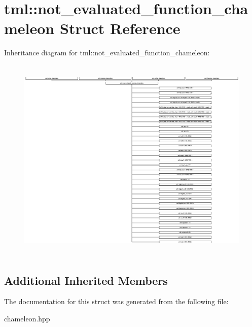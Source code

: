 \hypertarget{structtml_1_1not__evaluated__function__chameleon}{\section{tml\+:\+:not\+\_\+evaluated\+\_\+function\+\_\+chameleon Struct Reference}
\label{structtml_1_1not__evaluated__function__chameleon}
}
Inheritance diagram for tml\+:\+:not\+\_\+evaluated\+\_\+function\+\_\+chameleon\+:\begin{figure}[H]
\begin{center}
\leavevmode
\includegraphics[height=9.939148cm]{structtml_1_1not__evaluated__function__chameleon}
\end{center}
\end{figure}
\subsection*{Additional Inherited Members}


The documentation for this struct was generated from the following file\+:\begin{DoxyCompactItemize}
\item 
chameleon.\+hpp\end{DoxyCompactItemize}
